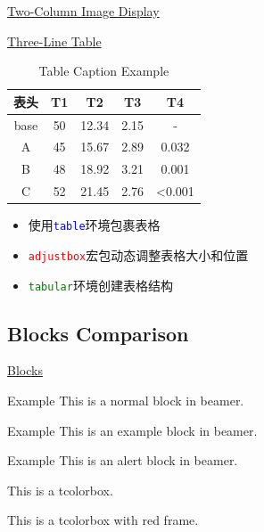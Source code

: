 \documentclass[11pt,aspectratio=43,xcolor={dvipsnames},hyperref={pdftex,pdfpagemode=UseNone,hidelinks,pdfdisplaydoctitle=true},usepdftitle=false]{ctexbeamer}
\begin{document}
\begin{frame}{\underline{Two-Column Image Display}}
  \vspace{0.5cm}
\end{frame}

\begin{frame}{\underline{Three-Line Table}}
  \centering
  
\begin{table}[h]
  \centering
  \caption{Table Caption Example}
  \begin{adjustbox}{width=0.5\textwidth,center}
    \begin{tabular}{c|c|c|c|c}
      \toprule
      \textbf{表头} & \textbf{T1} & \textbf{T2} & \textbf{T3} & \textbf{T4} \\
      \midrule
      base & 50 & 12.34 & 2.15 & - \\
      A & 45 & 15.67 & 2.89 & 0.032 \\
      B & 48 & 18.92 & 3.21 & 0.001 \\
      C & 52 & 21.45 & 2.76 & <0.001 \\
      \bottomrule
    \end{tabular}
  \end{adjustbox}
\end{table} 
  \vspace{0.3cm}
  
  \begin{itemize}
    \item 使用\texttt{\textcolor{blue}{table}}环境包裹表格
    \item \texttt{\textcolor{red}{adjustbox}}宏包动态调整表格大小和位置
    \item \texttt{\textcolor{green}{tabular}}环境创建表格结构
  \end{itemize}
\end{frame}

\subsection{Blocks Comparison}
\begin{frame}
  \subsectionpage
\end{frame}
\begin{frame}{\underline{Blocks}}
  \begin{block}{Example}
    This is a normal block in beamer.
  \end{block}

  \begin{exampleblock}{Example}
    This is an example block in beamer.
  \end{exampleblock}

  \begin{alertblock}{Example}
    This is an alert block in beamer.
  \end{alertblock}

  \begin{tcolorbox}
    This is a tcolorbox.
  \end{tcolorbox}

  \begin{tcolorbox}[colframe=purple!70,colback=red!10]
    This is a tcolorbox with red frame.
  \end{tcolorbox}
\end{frame}
\end{document}
